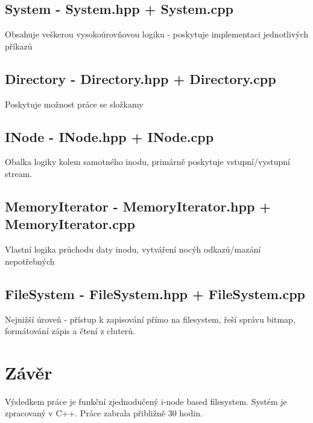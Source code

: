 \documentclass[a4paper,12pt]{article}
\begin{document}
	\subsection{System - System.hpp + System.cpp}
	Obsahuje veškerou vysokoúrovňovou logiku - poskytuje implementaci jednotlivých příkazů
	\subsection{Directory - Directory.hpp + Directory.cpp}
	Poskytuje možnost práce se složkamy
	\subsection{INode - INode.hpp + INode.cpp}
	Obalka logiky kolem samotného inodu, primárně poskytuje vstupní/vystupní stream.
	\subsection{MemoryIterator - MemoryIterator.hpp + MemoryIterator.cpp}
	Vlastní logika průchodu daty inodu, vytváření nocýh odkazů/mazání nepotřebných
	\subsection{FileSystem - FileSystem.hpp + FileSystem.cpp}
	Nejnižší úroveň - přístup k zapisování přímo na filesystem, řeší správu bitmap, formátování zápis a čtení z cluterů.
    
	\newpage
	\section{Závěr}
	Výsledkem práce je funkční zjednodučený i-node based filesystem. Systém je zpracovaný v C++. Práce zabrala přibližně 30 hodin.
\end{document}
